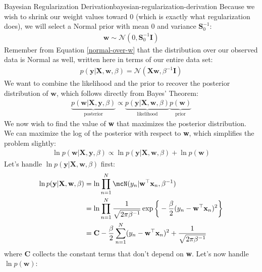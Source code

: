 \begin{derivation}{Bayesian Regularization Derivation}{bayesian-regularization-derivation}
    Because we wish to shrink our weight values toward 0 (which is exactly what regularization does), we will select a Normal prior with mean 0 and variance $\boldsymbol{S}_{0}^{-1}$:
    \begin{align*}
        \textbf{w} \sim \mathcal{N}(0, \boldsymbol{S}_{0}^{-1}\textbf{I})
    \end{align*}
    Remember from Equation \ref{normal-over-w} that the distribution over our observed data is Normal as well, written here in terms of our entire data set:
    \begin{align*}
        p(\textbf{y} | \textbf{X}, \textbf{w}, \beta) = \mathcal{N}(\textbf{X}\textbf{w}, \beta^{-1}\textbf{I})
    \end{align*}
    We want to combine the likelihood and the prior to recover the posterior distribution of $\textbf{w}$, which follows directly from Bayes' Theorem:
    \begin{align*}
        \underbrace{p(\textbf{w}|\textbf{X},\textbf{y}, \beta)}_{\text{posterior}} \propto \underbrace{p(\textbf{y}| \textbf{X}, \textbf{w}, \beta)}_{\text{likelihood}}\underbrace{p(\textbf{w})}_{\text{prior}}
    \end{align*}
    We now wish to find the value of \textbf{w} that maximizes the posterior distribution. We can maximize the log of the posterior with respect to \textbf{w}, which simplifies the problem slightly:
    \begin{align*}
        \ln{p(\textbf{w}|\textbf{X},\textbf{y}, \beta)} \propto \ln{p(\textbf{y}| \textbf{X}, \textbf{w}, \beta)} + \ln{p(\textbf{w})}
    \end{align*}
    Let's handle $\ln{p(\textbf{y}| \textbf{X}, \textbf{w}, \beta)}$ first:
    \begin{align*}
        \ln{p(\textbf{y}| \textbf{X}, \textbf{w}, \beta)} &= \ln{\prod_{n=1}^{N} \mcN(y_{n} | \textbf{w}^\top \textbf{x}_{n}, \beta^{-1})} \\
        &= \ln{\prod_{n=1}^{N} \frac{1}{\sqrt{2\pi\beta^{-1}}} \exp{\bigg\{-\frac{\beta}{2}(y_{n} - \textbf{w}^\top \textbf{x}_{n})^2\bigg\}}} \\
        &= \textbf{C} -\frac{\beta}{2}\sum_{n=1}^{N} (y_{n} - \textbf{w}^\top \textbf{x}_{n})^2 + \frac{1}{\sqrt{2\pi\beta^{-1}}}
    \end{align*}
    where \textbf{C} collects the constant terms that don't depend on \textbf{w}. Let's now handle $\ln{p(\textbf{w})}$:

\end{derivation}
